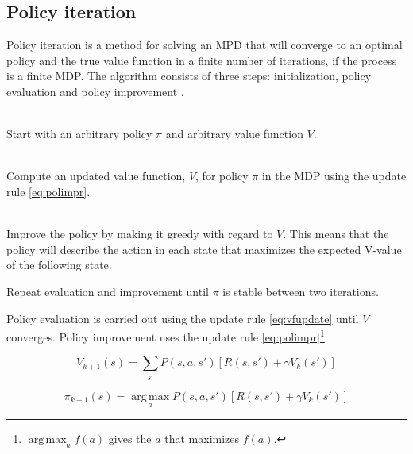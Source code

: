 \subsection{Policy iteration}
\label{sec:pol_itr}

Policy iteration is a method for solving an MPD that will converge to an
optimal policy and the true value function in a finite number of iterations, if
the process is a finite MDP. The algorithm consists of three steps:
initialization, policy evaluation and policy improvement
\parencite{barto1998reinforcement}.

\begin{description}
\item[Initialization] \hfill \\
    Start with an arbitrary policy $\pi$ and arbitrary value function $V$.
\item[Policy evaluation] \hfill \\
    Compute an updated value function, $V$, for policy $\pi$ in the MDP using the update rule \eqref{eq:polimpr}.
\item[Policy improvement] \hfill \\
    Improve the policy by making it greedy with regard to $V$. This means that the policy will describe the action in each state that maximizes the expected V-value of the following state. 
\item Repeat evaluation and improvement until $\pi$ is stable between two iterations.
\end{description}

Policy evaluation is carried out using the update rule \eqref{eq:vfupdate} until $V$ converges. 
Policy improvement uses the update rule \eqref{eq:polimpr}\footnote{$\operatorname*{arg\,max} _a f(a)$ gives the $a$ that maximizes $f(a)$.}.


\begin{equation} \label{eq:vfupdate}
V_{k+1} (s) = \sum_{s'} P(s, a, s') \left[ R(s, s') + \gamma V_k(s')  \right]
\end{equation}

\begin{equation} \label{eq:polimpr}
\pi_{k+1} (s) = \operatorname*{arg\,max}_a P(s, a, s') \left[ R(s, s') + \gamma V_k(s') \right]
\end{equation}
